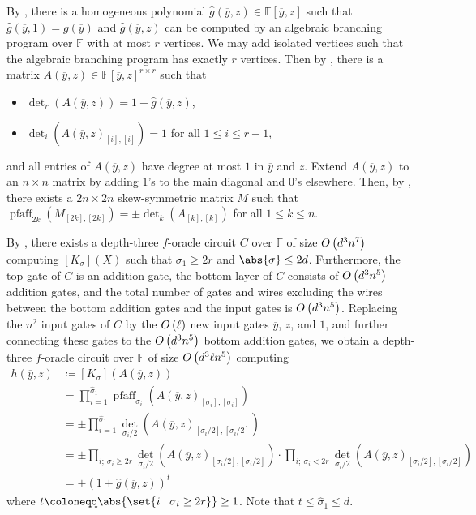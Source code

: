\documentclass[10pt,a4paper]{amsart}
\DeclareMathOperator{\pfaff}{pfaff}
\newcommand*\F{\mathbb{F}}
\newcommand*\defeq{\coloneqq}
\newcommand*\bigO[1]{%
    O\kern-0.0pt\left(#1\right)
}
\begin{document}
\begin{pf}
    By , there is a homogeneous polynomial $\widehat{g}(\overline{y}, z) \in \F[\overline{y}, z]$ such that $\widehat{g}(\overline{y}, 1) = g(\overline{y})$ and $\widehat{g}(\overline{y}, z)$ can be computed by an algebraic branching program over $\F$ with at most $r$ vertices.
    We may add isolated vertices such that the algebraic branching program has exactly $r$ vertices.
    Then by , there is a matrix $A(\overline{y}, z) \in \F[\overline{y}, z]^{r \times r}$ such that
    \begin{itemize}
        \item $\det_r(A(\overline{y}, z)) = 1 + \widehat{g}(\overline{y}, z)$,
        \item $\det_i(A(\overline{y}, z)_{[i], [i]}) = 1$ for all $1 \leq i \leq r - 1$,
    \end{itemize}
    and all entries of $A(\overline{y}, z)$ have degree at most $1$ in $\overline{y}$ and $z$.  
    Extend $A(\overline{y}, z)$ to an $n\times n$ matrix by adding $1$'s to the main diagonal and $0$'s elsewhere.
     Then, by , there exists a $2n \times 2n$ skew-symmetric matrix $M$ such that $\pfaff_{2k}(M_{[2k], [2k]}) = \pm \det_k(A_{[k], [k]})$ for all $1 \leq k \leq n$.
    
    By , there exists a depth-three $f$-oracle circuit $C$ over $\F$ of size $\bigO{d^3 n^7}$ computing $[K_\sigma](X)$ such that $\sigma_1 \geq 2r$ and $\abs{\sigma} \leq 2d$.
    Furthermore, the top gate of $C$ is an addition gate, the bottom layer of $C$ consists of $\bigO{d^3 n^5}$ addition gates, and the total number of gates and wires excluding the wires between the bottom addition gates and the input gates is $\bigO{d^3 n^5}$.
    Replacing the $n^2$ input gates of $C$ by the $\bigO{\ell}$ new input gates $\overline{y}$, $z$, and $1$, and further connecting these gates to the $\bigO{d^3 n^5}$ bottom addition gates, we obtain a depth-three $f$-oracle circuit over $\F$ of size $\bigO{d^3 \ell n^5}$ computing 
    \begin{align*}
        h(\overline{y}, z) &\defeq [K_\sigma](A(\overline{y}, z)) \\
                           &= \prod_{i = 1}^{\widehat{\sigma}_1} \pfaff_{\sigma_i}(A(\overline{y}, z)_{[\sigma_i], [\sigma_i]}) \\
                           &= \pm \prod_{i = 1}^{\widehat{\sigma}_1} \det_{\sigma_i / 2}(A(\overline{y}, z)_{[\sigma_i / 2], [\sigma_i / 2]}) \\
                           &= \pm \prod_{i;\ \sigma_i \geq 2r} \det_{\sigma_i / 2} (A(\overline{y}, z)_{[\sigma_i / 2], [\sigma_i / 2]}) \cdot \prod_{i;\ \sigma_i < 2r} \det_{\sigma_i / 2}(A(\overline{y}, z)_{[\sigma_i / 2], [\sigma_i / 2]}) \\
                           &= \pm (1 + \widehat{g}(\overline{y}, z))^t
    \end{align*}
    where $t \defeq \abs{\set{i \mid \sigma_i \geq 2r}} \geq 1$.
    Note that $t \leq \widehat{\sigma}_1 \leq d$.
    

\end{pf}
\end{document}
